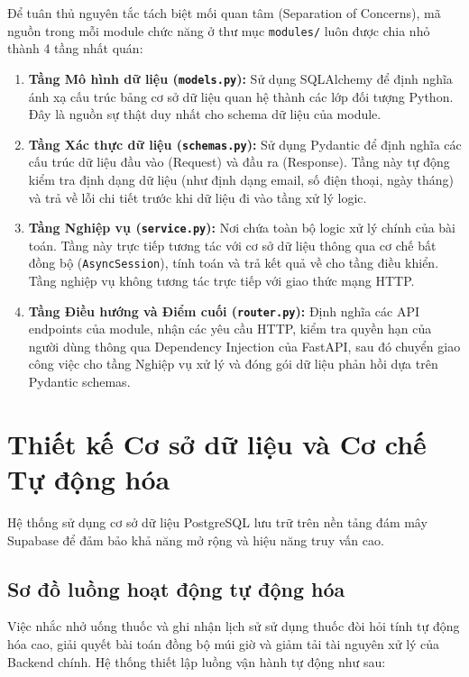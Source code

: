 \documentclass[12pt,a4paper]{report}
\begin{document}
Để tuân thủ nguyên tắc tách biệt mối quan tâm (Separation of Concerns), mã nguồn trong mỗi module chức năng ở thư mục \texttt{modules/} luôn được chia nhỏ thành 4 tầng nhất quán:

\begin{enumerate}[leftmargin=2em, itemsep=3pt]
    \item \textbf{Tầng Mô hình dữ liệu (\texttt{models.py}):} Sử dụng SQLAlchemy để định nghĩa ánh xạ cấu trúc bảng cơ sở dữ liệu quan hệ thành các lớp đối tượng Python. Đây là nguồn sự thật duy nhất cho schema dữ liệu của module.
    \item \textbf{Tầng Xác thực dữ liệu (\texttt{schemas.py}):} Sử dụng Pydantic để định nghĩa các cấu trúc dữ liệu đầu vào (Request) và đầu ra (Response). Tầng này tự động kiểm tra định dạng dữ liệu (như định dạng email, số điện thoại, ngày tháng) và trả về lỗi chi tiết trước khi dữ liệu đi vào tầng xử lý logic.
    \item \textbf{Tầng Nghiệp vụ (\texttt{service.py}):} Nơi chứa toàn bộ logic xử lý chính của bài toán. Tầng này trực tiếp tương tác với cơ sở dữ liệu thông qua cơ chế bất đồng bộ (\texttt{AsyncSession}), tính toán và trả kết quả về cho tầng điều khiển. Tầng nghiệp vụ không tương tác trực tiếp với giao thức mạng HTTP.
    \item \textbf{Tầng Điều hướng và Điểm cuối (\texttt{router.py}):} Định nghĩa các API endpoints của module, nhận các yêu cầu HTTP, kiểm tra quyền hạn của người dùng thông qua Dependency Injection của FastAPI, sau đó chuyển giao công việc cho tầng Nghiệp vụ xử lý và đóng gói dữ liệu phản hồi dựa trên Pydantic schemas.
\end{enumerate}

\section{Thiết kế Cơ sở dữ liệu và Cơ chế Tự động hóa}

Hệ thống sử dụng cơ sở dữ liệu PostgreSQL lưu trữ trên nền tảng đám mây Supabase để đảm bảo khả năng mở rộng và hiệu năng truy vấn cao.

\subsection{Sơ đồ luồng hoạt động tự động hóa}

Việc nhắc nhở uống thuốc và ghi nhận lịch sử sử dụng thuốc đòi hỏi tính tự động hóa cao, giải quyết bài toán đồng bộ múi giờ và giảm tải tài nguyên xử lý của Backend chính. Hệ thống thiết lập luồng vận hành tự động như sau:
\end{document}
